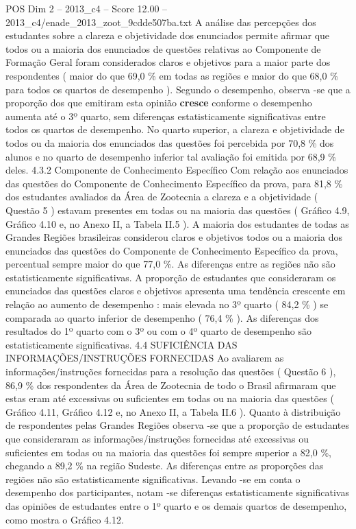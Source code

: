 \begin{textsample}{POS Dim 2 – 2013\_c4 – Score 12.00 – 2013\_c4/enade\_2013\_zoot\_9cdde507ba.txt}
A análise das percepções dos estudantes sobre a clareza e objetividade dos enunciados permite afirmar que todos ou a maioria dos enunciados de questões relativas ao Componente de Formação Geral foram considerados claros e objetivos para a maior parte dos respondentes ( maior do que 69,0 \% em todas as regiões e maior do que 68,0 \% para todos os quartos de desempenho ).
Segundo o desempenho, observa -se que a proporção dos que emitiram esta opinião \textbf{cresce} conforme o desempenho aumenta até o 3º quarto, sem diferenças estatisticamente significativas entre todos os quartos de desempenho.
No quarto superior, a clareza e objetividade de todos ou da maioria dos enunciados das questões foi percebida por 70,8 \% dos alunos e no quarto de desempenho inferior tal avaliação foi emitida por 68,9 \% deles. 4.3.2 Componente de Conhecimento Específico Com relação aos enunciados das questões do Componente de Conhecimento Específico da prova, para 81,8 \% dos estudantes avaliados da Área de Zootecnia a clareza e a objetividade ( Questão 5 ) estavam presentes em todas ou na maioria das questões ( Gráfico 4.9, Gráfico 4.10 e, no Anexo II, a Tabela II.5 ).
A maioria dos estudantes de todas as Grandes Regiões brasileiras considerou claros e objetivos todos ou a maioria dos enunciados das questões do Componente de Conhecimento Específico da prova, percentual sempre maior do que 77,0 \%.
As diferenças entre as regiões não são estatisticamente significativas.
A proporção de estudantes que consideraram os enunciados das questões claros e objetivos apresenta uma tendência crescente em relação ao aumento de desempenho : mais elevada no 3º quarto ( 84,2 \% ) se comparada ao quarto inferior de desempenho ( 76,4 \% ).
As diferenças dos resultados do 1º quarto com o 3º ou com o 4º quarto de desempenho são estatisticamente significativas. 4.4 SUFICIÊNCIA DAS INFORMAÇÕES/INSTRUÇÕES FORNECIDAS Ao avaliarem as informações/instruções fornecidas para a resolução das questões ( Questão 6 ), 86,9 \% dos respondentes da Área de Zootecnia de todo o Brasil afirmaram que estas eram até excessivas ou suficientes em todas ou na maioria das questões ( Gráfico 4.11, Gráfico 4.12 e, no Anexo II, a Tabela II.6 ).
Quanto à distribuição de respondentes pelas Grandes Regiões observa -se que a proporção de estudantes que consideraram as informações/instruções fornecidas até excessivas ou suficientes em todas ou na maioria das questões foi sempre superior a 82,0 \%, chegando a 89,2 \% na região Sudeste.
As diferenças entre as proporções das regiões não são estatisticamente significativas.
Levando -se em conta o desempenho dos participantes, notam -se diferenças estatisticamente significativas das opiniões de estudantes entre o 1º quarto e os demais quartos de desempenho, como mostra o Gráfico 4.12.

\end{textsample}
